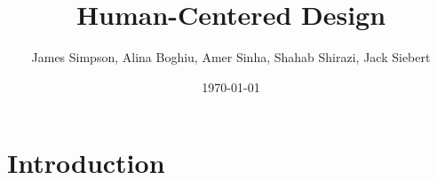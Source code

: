 \documentclass[12pt]{article}
\title{Human-Centered Design}
\author{James Simpson, Alina Boghiu, Amer Sinha, Shahab Shirazi, Jack Siebert}
\date{\today}
\begin{document}
\maketitle

\section{Introduction}
\end{document}
